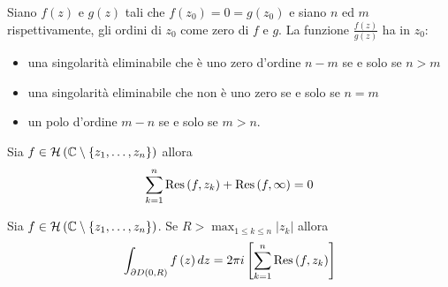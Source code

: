 \begin{thm}
Siano $f(z)$ e $g(z)$ tali che $f\left(z_{0}\right) = 0 = g\left(z_{0}\right)$ e siano $n$ ed $m$ rispettivamente, gli ordini di $z_{0}$ come zero di $f$ e $g$. La funzione $\frac{f(z)}{g(z)}$ ha in $z_{0}$:

\begin{itemize}
\item una singolarità eliminabile che è uno zero d'ordine $n - m$ se e solo se $n > m$
\item una singolarità eliminabile che non è uno zero se e solo se $n = m$
\item un polo d'ordine $m - n$ se e solo se $m > n$.
\end{itemize}
\end{thm}
\begin{thm}
Sia $f\in \mathcal{H} \left(\mathbb{C}  \setminus \left\{z_{1} ,\dotsc ,z_{n}\right\}\right)$ allora
\begin{equation*}
\sum\limits ^{n}_{k = 1}\operatorname{Res} \left(f,z_{k}\right) + \operatorname{Res} \left(f,\infty \right) = 0
\end{equation*}
\end{thm}
\begin{thm}
Sia $f\in \mathcal{H} \left(\mathbb{C}  \setminus \left\{z_{1} ,\dotsc ,z_{n}\right\}\right)$. Se $R > \max_{1\leqslant k\leqslant n}\left| z_{k}\right| $ allora
\begin{equation*}
\int\nolimits _{\partial D\left(0,R\right)} f\left(z\right) dz = 2\pi i\left[\sum\limits ^{n}_{k = 1}\operatorname{Res} \left(f,z_{k}\right)\right]
\end{equation*}
\end{thm}

